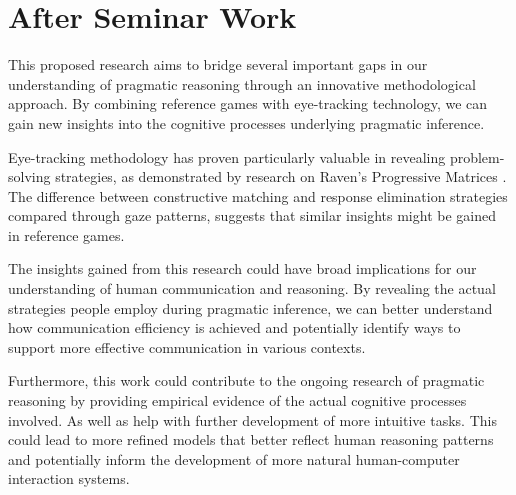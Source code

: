 \documentclass[11pt,a4paper]{article}
\begin{document}
\section{After Seminar Work}
This proposed research aims to bridge several important gaps in our understanding of pragmatic reasoning through an innovative methodological approach. By combining reference games with eye-tracking technology, we can gain new insights into the cognitive processes underlying pragmatic inference.

Eye-tracking methodology has proven particularly valuable in revealing problem-solving strategies, as demonstrated by research on Raven's Progressive Matrices \citep{Vigneau_2006}. The difference between constructive matching and response elimination strategies compared through gaze patterns, suggests that similar insights might be gained in reference games.

The insights gained from this research could have broad implications for our understanding of human communication and reasoning. By revealing the actual strategies people employ during pragmatic inference, we can better understand how communication efficiency is achieved and potentially identify ways to support more effective communication in various contexts.

Furthermore, this work could contribute to the ongoing research \cite{Mayn_2022,Duff_2024_pres,Mayn_2024,Mayn_2024_pres} of pragmatic reasoning by providing empirical evidence of the actual cognitive processes involved. As well as help with further development of more intuitive tasks. This could lead to more refined models that better reflect human reasoning patterns and potentially inform the development of more natural human-computer interaction systems.



\end{document}

